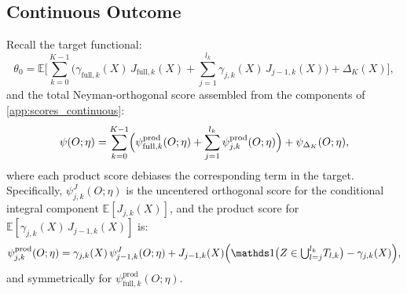 \subsection{Continuous Outcome}\label{oa:orthogonality_continuous}

Recall the target functional:
\begin{equation}\label{eq:pf_target_recall}
    \theta_0 = \mathbb{E}\Bigg[\sum_{k=0}^{K-1}\bigg(\gamma_{\mathrm{full},k}(X)\,J_{\mathrm{full},k}(X) + \sum_{j=1}^{l_k} \gamma_{j,k}(X)\,J_{j-1,k}(X)\bigg) + \Delta_K(X)\Bigg],
\end{equation}
and the total Neyman-orthogonal score assembled from the components of \cref{app:scores_continuous}:
\begin{equation}\label{eq:pf_total_score}
    \psi(O;\eta) = \sum_{k=0}^{K-1}\Bigl(\psi_{\mathrm{full},k}^{\mathrm{prod}}(O;\eta) + \sum_{j=1}^{l_k}\psi_{j,k}^{\mathrm{prod}}(O;\eta)\Bigr) + \psi_{\Delta_K}(O;\eta),
\end{equation}
where each product score debiases the corresponding term in the target. Specifically, $\psi_{j,k}^J(O;\eta)$ is the uncentered orthogonal score for the conditional integral component $\mathbb{E}[J_{j,k}(X)]$, and the product score for $\mathbb{E}[\gamma_{j,k}(X)\,J_{j-1,k}(X)]$ is:
\begin{equation}\label{eq:pf_prod_score_recall}
    \psi_{j,k}^{\mathrm{prod}}(O;\eta) = \gamma_{j,k}(X)\,\psi_{j-1,k}^J(O;\eta) + J_{j-1,k}(X)\Bigl(\indicator\bigl(Z \in {\textstyle\bigcup_{l=j}^{l_k}} T_{l,k}\bigr) - \gamma_{j,k}(X)\Bigr),
\end{equation}
and symmetrically for $\psi_{\mathrm{full},k}^{\mathrm{prod}}(O;\eta)$.

